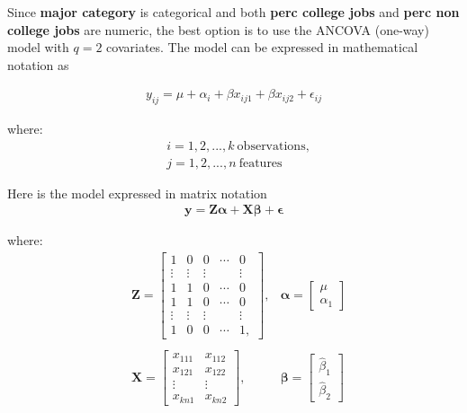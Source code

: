 \documentclass[10pt, twoside, openleft]{article}
\newcommand{\betahat}{\hat{\beta}} %
\begin{document}
\noindent
Since \textbf{major category} is categorical and both \textbf{perc college jobs} and
\textbf{perc non college jobs} are numeric, the best option is to use the ANCOVA
(one-way) model with $q = 2$ covariates. The model can be expressed in mathematical
notation as
\smallskip

\begin{equation*}
\begin{aligned}
y_{ij} = \mu + \alpha_{i} + \beta x_{ij1} + \beta x_{ij2} + \epsilon_{ij}
\end{aligned}
\end{equation*}
\smallskip

where:
\begin{equation*}
\begin{aligned}
& i = 1,2,...,k \ \text{observations}, \\
& j = 1,2,...,n \ \text{features}
\end{aligned}
\end{equation*}
\smallskip

\noindent
Here is the model expressed in matrix notation
\begin{equation*}
\begin{aligned}
\mathbf{y} = \mathbf{Z} \mathbf{\alpha} + \mathbf{X} \mathbf{\beta} + \mathbf{\epsilon}
\end{aligned}
\end{equation*}
\smallskip

where:
\begin{equation*}
\begin{aligned}
& \mathbf{Z} =
\left[ \begin{array}{ccccc}
    1 & 0 & 0 & \cdots & 0 \\
    \vdots & \vdots & \vdots &  & \vdots \\
    1 & 1 & 0 & \cdots & 0 \\
    1 & 1 & 0 & \cdots & 0 \\
    \vdots & \vdots & \vdots &  & \vdots \\
    1 & 0 & 0 & \cdots & 1, 
\end{array}\right]
, & \mathbf{\alpha} =
\left[ \begin{array}{c}
    \mu \\
    \alpha_{1}
\end{array}\right] \\
& & \\
& \mathbf{X} =
\left[ \begin{array}{ccccc}
    x_{111} & x_{112} \\
    x_{121} & x_{122} \\
    \vdots & \vdots \\
    x_{kn1} & x_{kn2}
\end{array}\right]
, & \mathbf{\beta} =
\left[ \begin{array}{c}
    \betahat_{1} \\
    \betahat_{2} 
\end{array}\right]
\end{aligned}
\end{equation*}
\smallskip
\end{document}
